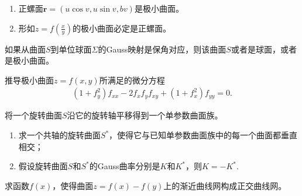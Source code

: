 \documentclass[../../main.tex]{subfiles}%
\begin{document}
\begin{example}
\begin{enumerate}[(1)]
\item 正螺面$\bm{r}=(u\cos v,u\sin v,bv)$是极小曲面。

\item 形如$z = f\left(\frac{x}{y}\right)$的极小曲面必定是正螺面。
\end{enumerate}
\end{example}

\begin{example}
如果从曲面$S$到单位球面$\Sigma$的Gauss映射是保角对应，则该曲面$S$或者是球面，或者是极小曲面。
\end{example}

\begin{example}
推导极小曲面$z = f(x,y)$所满足的微分方程
\begin{align*}
(1 + f_{y}^{2})f_{xx} - 2f_{x}f_{y}f_{xy} + (1 + f_{x}^{2})f_{yy} = 0.
\end{align*}
\end{example}

\begin{example}
将一个旋转曲面$S$沿它的旋转轴平移得到一个单参数曲面族。
\begin{enumerate}[(1)]
\item 求一个共轴的旋转曲面$S^*$，使得它与已知单参数曲面族中的每一个曲面都垂直相交；
\item 假设旋转曲面$S$和$S^*$的Gauss曲率分别是$K$和$K^*$，则$K = -K^*$.
\end{enumerate}
\end{example}

\begin{example}
求函数$f(x)$，使得曲面$z = f(x) - f(y)$上的渐近曲线网构成正交曲线网。
\end{example}
\end{document}

